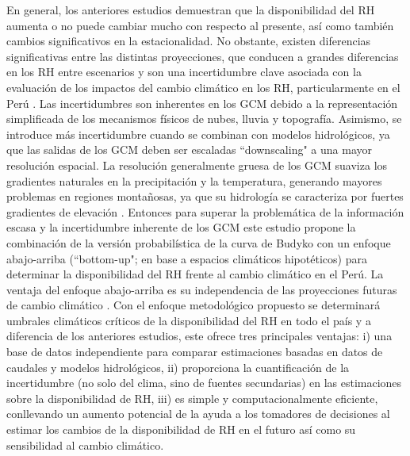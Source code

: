 \documentclass[12pt]{article}
\begin{document}
En general, los anteriores estudios demuestran que la disponibilidad del RH aumenta o no puede cambiar mucho con respecto al presente, así como también cambios significativos en la estacionalidad. No obstante, existen diferencias significativas entre las distintas proyecciones, que conducen a grandes diferencias en los RH entre escenarios \citep{Vuille2008} y son una incertidumbre clave asociada con la evaluación de los impactos del cambio climático en los RH, particularmente en el Perú \citep{VanSoesbergen2016}. Las incertidumbres son inherentes en los GCM debido a la representación simplificada de los mecanismos físicos de nubes, lluvia y topografía. Asimismo, se introduce más incertidumbre cuando se combinan con modelos hidrológicos, ya que las salidas de los GCM deben ser escaladas “downscaling" a una mayor resolución espacial. La resolución generalmente gruesa de los GCM suaviza los gradientes naturales en la precipitación y la temperatura, generando mayores problemas en regiones montañosas, ya que su hidrología se caracteriza por fuertes gradientes de elevación \citep{Buytaert2010}. Entonces para superar la problemática de la información escasa y la incertidumbre inherente de los GCM este estudio propone la combinación de la versión probabilística de la curva de Budyko \citep{Singh2015,Greve2015} con un enfoque abajo-arriba (``bottom-up"; en base a espacios climáticos hipotéticos) para determinar la disponibilidad del RH frente al cambio climático en el Perú. La ventaja del enfoque abajo-arriba es su independencia de las proyecciones futuras de cambio climático \citep{Singh2014,Poff2016}. Con el enfoque metodológico propuesto se determinará umbrales climáticos críticos de la disponibilidad del RH en todo el país y a diferencia de los anteriores estudios, este ofrece tres principales ventajas: i) una base de datos independiente para comparar estimaciones basadas en datos de caudales y modelos hidrológicos, ii) proporciona la cuantificación de la incertidumbre (no solo del clima, sino de fuentes secundarias) en las estimaciones sobre la disponibilidad de RH, iii) es simple y computacionalmente eficiente, conllevando un aumento potencial de la ayuda a los tomadores de decisiones al estimar los cambios de la disponibilidad de RH en el futuro así como su sensibilidad al cambio climático.
\end{document}
